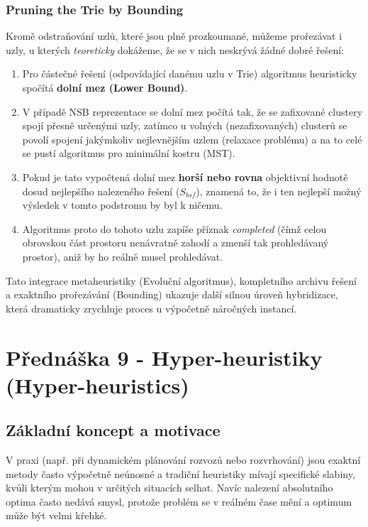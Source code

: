 \documentclass[12pt,a4paper]{article}
\theoremstyle{definition}
\begin{document}
\subsubsection{Pruning the Trie by Bounding}
Kromě odstraňování uzlů, které jsou plně prozkoumané, můžeme prořezávat i uzly, u kterých \textit{teoreticky} dokážeme, že se v nich neskrývá žádné dobré řešení:
\begin{enumerate}
    \item Pro částečné řešení (odpovídající danému uzlu v Trie) algoritmus heuristicky spočítá \textbf{dolní mez (Lower Bound)}. 
    \item V případě NSB reprezentace se dolní mez počítá tak, že se zafixované clustery spojí přesně určenými uzly, zatímco u volných (nezafixovaných) clusterů se povolí spojení jakýmkoliv nejlevnějším uzlem (relaxace problému) a na to celé se pustí algoritmus pro minimální kostru (MST).
    \item Pokud je tato vypočtená dolní mez \textbf{horší nebo rovna} objektivní hodnotě dosud nejlepšího nalezeného řešení ($S_{bsf}$), znamená to, že i ten nejlepší možný výsledek v tomto podstromu by byl k ničemu.
    \item Algoritmus proto do tohoto uzlu zapíše příznak \textit{completed} (čímž celou obrovskou část prostoru nenávratně zahodí a zmenší tak prohledávaný prostor), aniž by ho reálně musel prohledávat.
\end{enumerate}

Tato integrace metaheuristiky (Evoluční algoritmus), kompletního archivu řešení a exaktního prořezávání (Bounding) ukazuje další silnou úroveň hybridizace, která dramaticky zrychluje proces u výpočetně náročných instancí.

\section{Přednáška 9 - Hyper-heuristiky (Hyper-heuristics)}

\subsection{Základní koncept a motivace}
V praxi (např. při dynamickém plánování rozvozů nebo rozvrhování) jsou exaktní metody často výpočetně neúnosné a tradiční heuristiky mívají specifické slabiny, kvůli kterým mohou v určitých situacích selhat. Navíc nalezení absolutního optima často nedává smysl, protože problém se v reálném čase mění a optimum může být velmi křehké. 
\end{document}
